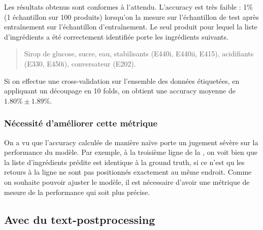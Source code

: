                 Les résultats obtenus sont conformes à l'attendu.
                L'accuracy est très faible : 1\% (1 échantillon sur 100 produits) lorsqu'on la mesure sur l'échantillon de test après entraînement sur l'échantillon d'entraînement.
                Le seul produit pour lequel la liste d'ingrédients a été correctement identifiée porte les ingrédients suivants.
                \begin{quotation}
                    Sirop de glucose, sucre, eau, stabilisants (E440i, E440ii, E415), acidifiants (E330, E450i), conversateur (E202).
                \end{quotation}
                Si on effectue une cross-validation sur l'ensemble des données étiquetées, en appliquant un découpage en 10 folds, on obtient une accuracy moyenne de $1.80\% \pm 1.89\%$.

                \subsubsection{Nécessité d'améliorer cette métrique}
                On a vu que l'accuracy calculée de manière naïve porte un jugement sévère sur la performance du modèle.
                Par exemple, à la troisième ligne de la , on voit bien que la liste d'ingrédients prédite est identique à la ground truth, si ce n'est qu les retours à la ligne ne sont pas positionnés exactement au même endroit.
                Comme on souhaite pouvoir ajuster le modèle, il est nécessaire d'avoir une métrique de mesure de la performance qui soit plus précise.

            \subsection{Avec du \og text-postprocessing \fg}
            \label{text_postprocessing}

